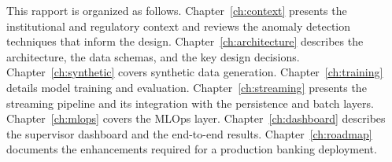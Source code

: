 This rapport is organized as follows. Chapter~\ref{ch:context} presents the institutional and regulatory context and reviews the anomaly detection techniques that inform the design. Chapter~\ref{ch:architecture} describes the architecture, the data schemas, and the key design decisions. Chapter~\ref{ch:synthetic} covers synthetic data generation. Chapter~\ref{ch:training} details model training and evaluation. Chapter~\ref{ch:streaming} presents the streaming pipeline and its integration with the persistence and batch layers. Chapter~\ref{ch:mlops} covers the MLOps layer. Chapter~\ref{ch:dashboard} describes the supervisor dashboard and the end-to-end results. Chapter~\ref{ch:roadmap} documents the enhancements required for a production banking deployment.
